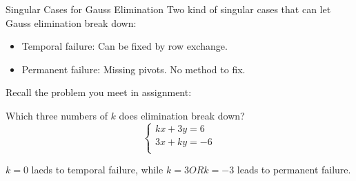 \documentclass{beamer}
\begin{document}
\begin{frame}{Singular Cases for Gauss Elimination}
Two kind of singular cases that can let Gauss elimination break down:
\begin{itemize}
    \item Temporal failure: Can be fixed by row exchange.
    \item Permanent failure: Missing pivots. No method to fix.
\end{itemize}

\vspace{7pt}
Recall the problem you meet in assignment:

\vspace{5pt}
Which three numbers of $k$ does elimination break down?
\begin{equation*}
    \begin{cases}
        kx+3y=6\\
        3x+ky=-6\\
    \end{cases}
\end{equation*}

$k=0$ laeds to temporal failure, while $k=3 OR k=-3$ leads to permanent failure.

\end{frame}
\end{document}
